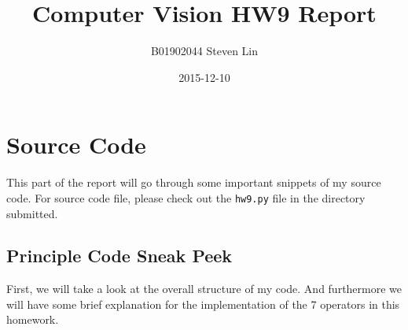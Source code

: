 \documentclass{article}
\title{Computer Vision HW9 Report}
\author{B01902044 Steven Lin}
\date{2015-12-10}
\newcommand{\code}[1]{\texttt{#1}}
\begin{document}
\maketitle
\newpage


\tableofcontents
\newpage

\section{Source Code}
This part of the report will go through some important snippets of my source code. For source code file, please check out the \code{hw9.py} file in the directory submitted.

\subsection{Principle Code Sneak Peek}
First, we will take a look at the overall structure of my code. And furthermore we will have some brief explanation for the implementation of the 7 operators in this homework.
\end{document}
